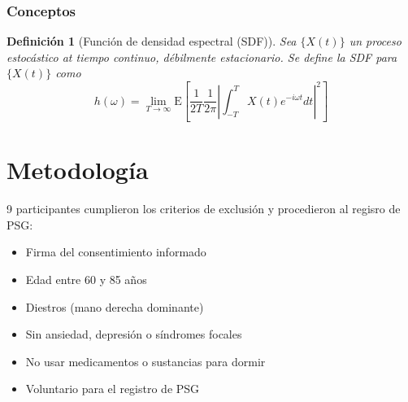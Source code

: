 \documentclass{beamer}
\newtheorem{defn}{Definici\'on}
\newcommand{\E}[1]{\mathrm{E}\left[ #1 \right]}
\newcommand{\abso}[1]{\left| #1 \right|}
\begin{document}

\begin{frame}\frametitle{Conceptos}
\begin{defn}[Funci\'on de densidad espectral (SDF)]
Sea $\{X(t)\}$ un proceso estoc\'astico at tiempo continuo, d\'ebilmente estacionario. 
Se define la SDF para $\{X(t)\}$ como
\begin{equation*}
h(\omega) = \lim_{T\rightarrow \infty} \E{ \frac{1}{2T} \frac{1}{2 \pi}
\abso{ \int_{-T}^{T} X(t) e^{-i \omega t} dt}^{2} }
\end{equation*}
\label{SDF}
\end{defn}
\end{frame}


%


%


\section{Metodolog\'ia}

\begin{frame}%
9 participantes cumplieron los criterios de exclusi\'on y procedieron al regisro de PSG:
\begin{itemize}
\item Firma del consentimiento informado
\item Edad entre 60 y 85 a\~nos
\item Diestros (mano derecha dominante)
\item Sin ansiedad, depresi\'on o s\'indromes focales
\item No usar medicamentos o sustancias para dormir
\item Voluntario para el registro de PSG
\end{itemize}
\end{frame}
\end{document}

